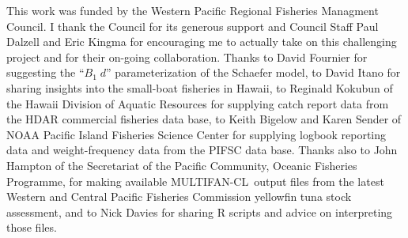 \documentclass[12pt,letterpaper,twoside]{article}
\newcommand\MFCL{MULTIFAN-CL}
\newcommand\Bd{B_1\; d}
\begin{document}
\vspace{4ex}
{}
This work was funded by the Western Pacific Regional Fisheries
Managment Council. I thank the Council for its generous support and
Council Staff Paul Dalzell and Eric Kingma for encouraging me to
actually take on this challenging project and for their on-going
collaboration.
Thanks to David Fournier for suggesting the ``$\Bd$''
parameterization of the Schaefer model,
to David Itano for sharing insights into the small-boat
fisheries in Hawaii,
to Reginald Kokubun of the Hawaii Division of Aquatic
Resources for supplying catch report data from the HDAR commercial
fisheries data base,
to Keith Bigelow and Karen Sender of NOAA Pacific
Island Fisheries Science Center for supplying logbook reporting data and
weight-frequency data from the PIFSC data base.
Thanks also to John Hampton of the Secretariat of the Pacific
Community, Oceanic Fisheries Programme, for making available \MFCL\
output files from the latest Western and Central Pacific
Fisheries Commission yellowfin tuna stock assessment, and to Nick
Davies for sharing R scripts and advice on interpreting those files.
\end{document}
